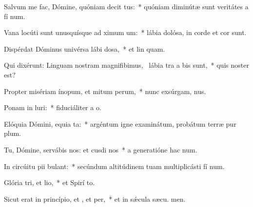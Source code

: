 \item Salvum me fac, Dómine, quóniam decit tus:~* quóniam diminútæ sunt veritátes a fí num.
\item Vana locúti sunt unusquísque ad ximum um:~* lábia dolósa, in corde et cor  sunt.
\item Dispérdat Dóminus univérsa lábi dosa,~* et lin quam.
\item Qui dixérunt: Linguam nostram magnifibimus,~\pscross{} lábia tra a bis sunt,~* quis noster  est?
\item Propter misériam ínopum, et mitum perum,~* nunc exsúrgam,  nus.
\item Ponam in luri:~* fiduciáliter a  o.
\item Elóquia Dómini, equia ta:~* argéntum igne examinátum, probátum terræ pur plum.
\item Tu, Dómine, servábis nos: et cusdi nos~* a generatióne hac  num.
\item In circúitu pii bulant:~* secúndum altitúdinem tuam multiplicásti fí num.
\item Glória tri, et lio,~* et Spirí to.
\item Sicut erat in princípio, et , et per,~* et in sǽcula sæcu. men.
